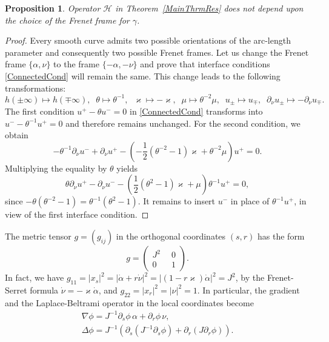 \documentclass[reqno]{amsart}
\theoremstyle{plain}
\newtheorem{prop}{Proposition}
\numberwithin{equation}{section}
\renewcommand{\kappa}{\varkappa}
\begin{document}
\begin{prop}\label{PropInvarianceOfCnds}
  Operator $\mathcal{H}$ in Theorem~\ref{MainThrmRes} does not depend upon the choice of the Frenet frame for  $\gamma$.
\end{prop}
\begin{proof}
Every smooth curve  admits two possible orientations of the arc-length parameter and consequently two possible  Frenet frames. Let us change the Frenet frame $\{\alpha, \nu\}$ to the frame $\{-\alpha, -\nu\}$ and prove that interface conditions \eqref{ConnectedCond} will remain the same. This change leads to the following transformations:
\begin{equation*}
h(\pm\infty)\mapsto h(\mp\infty),\;\;
\theta\mapsto \theta^{-1}, \;\; \kappa\mapsto -\kappa,\;\; \mu\mapsto \theta^{-2}\mu, \;\; u_\pm\mapsto u_\mp, \;\; \partial_\nu u_\pm \mapsto -\partial_\nu u_\mp.
\end{equation*}
The first condition $u^+-\theta u^-=0$ in \eqref{ConnectedCond} transforms into $u^--\theta^{-1} u^+=0$ and therefore remains unchanged. For the second condition, we obtain
\begin{equation*}
 	-\theta^{-1}\partial_\nu u^-+\partial_\nu u^+
	-\left(-\textstyle\frac{1}{2}(\theta^{-2}-1)\kappa
	+\theta^{-2}\mu\right) u^+=0.
\end{equation*}
Multiplying the equality by $\theta$  yields
\begin{equation*}
	\theta\partial_\nu u^+-\partial_\nu u^-
	-\left(\textstyle\frac{1}{2 }(\theta^{2}-1)\kappa+\mu\right) 	\theta^{-1} u^+=0,
\end{equation*}
since $-\theta(\theta^{-2}-1)=\theta^{-1}(\theta^{2}-1)$. It remains to insert $u^-$ in place of $\theta^{-1} u^+$, in view of the first interface condition.
\end{proof}





The metric tensor $g=(g_{ij})$ in the orthogonal coordinates $(s,r)$  has the form
  \begin{equation*}
    g=
    \begin{pmatrix}
      J^2\phantom{0} & 0 \\
          0\phantom{0} & 1
    \end{pmatrix}.
  \end{equation*}
In fact, we have
$g_{11}=|x_s|^2=|\dot{\alpha}+r \dot{\nu}|^2
=|(1-r\kappa) \dot{\alpha}|^2=J^2$,
by the Frenet-Serret formula $\dot{\nu}=-\kappa \dot{\alpha}$, and $g_{22}=|x_r|^2=|\nu|^2=1$.
In particular, the gradient and the  Laplace-Beltrami operator in the local coordinates become
\begin{gather}\label{GradientInSN}
\nabla \phi=J^{-1}\partial_s\phi\, \alpha+\partial_r\phi\, \nu,
\\\label{LaplacianInSN}
\Delta \phi=J^{-1}\left(\partial_s(J^{-1}\partial_s \phi)+ \partial_r(J\partial_r \phi)\right).
\end{gather}
\end{document}
